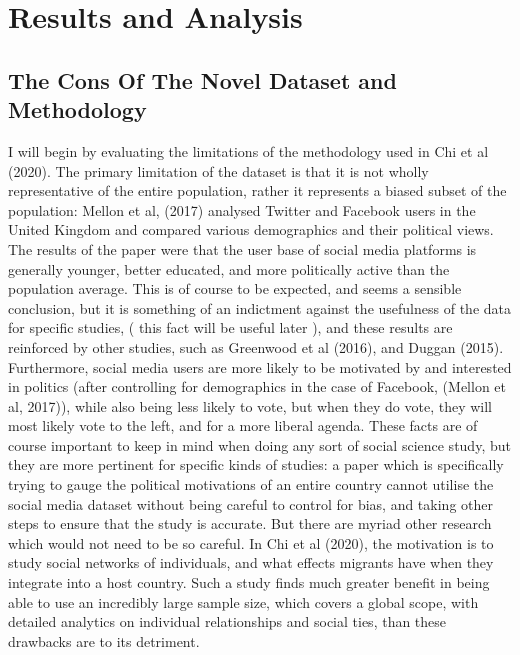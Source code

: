 \documentclass[12pt]{article}
\begin{document}
\section{Results and Analysis}

\subsection{The Cons Of The Novel Dataset and Methodology}
I will begin by evaluating the limitations of the methodology used in Chi et al (2020). The 
primary limitation of the dataset is that it is not wholly representative of the entire 
population, rather it represents a biased subset of the population: Mellon et al, (2017)
analysed Twitter and Facebook users in the United Kingdom and compared various demographics 
and their political views. The results of the paper were that the user base of social 
media platforms is generally younger, better educated, and more politically active 
than the population average. This is of course to be expected, and seems a sensible conclusion, 
but it is something of an indictment against the usefulness of the data for specific studies, (
	this fact will be useful later
), and these results are reinforced by other studies, such as Greenwood et al (2016), and 
Duggan (2015). Furthermore, social media users are more likely to be motivated by and interested 
in politics (after controlling for demographics in the case of Facebook, (Mellon et al, 2017)),
while also being less likely to vote, but when they do vote, they will most likely vote to the 
left, and for a more liberal agenda. These facts are of course important to keep in mind 
when doing any sort of social science study, but they are more pertinent for specific kinds 
of studies: a paper which is specifically trying to gauge the political motivations of an 
entire country cannot utilise the social media dataset without being careful to control 
for bias, and taking other steps to ensure that the study is accurate. But there are myriad
other research which would not need to be so careful. In Chi et al (2020), the motivation 
is to study social networks of individuals, and what effects migrants have when they integrate 
into a host country. Such a study finds much greater benefit in being able to use an 
incredibly large sample size, which covers a global scope, with detailed analytics on 
individual relationships and social ties, than these drawbacks are to its detriment. 
\end{document}
